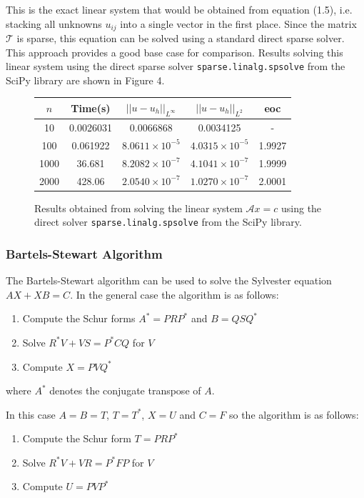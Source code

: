 \documentclass{article}
\numberwithin{equation}{section}
\begin{document}
This is the exact linear system that would be obtained from equation (1.5), i.e. stacking all unknowns $u_{ij}$ into a single vector in the first place. Since the matrix $\mathcal{T}$ is sparse, this equation can be solved using a standard direct sparse solver. This approach provides a good base case for comparison. Results solving this linear system using the direct sparse solver \texttt{sparse.linalg.spsolve} from the SciPy library are shown in Figure 4.

\begin{figure}[H]
\centering
\begin{tabular}{|c|c|c|c|c|}
\hline
$n$ & Time(s) & $|| u - u_h ||_{L^{\infty}}$ &$|| u - u_h ||_{L^{2}}$ & eoc \\
\hline
10 & 0.0026031 & 0.0066868 & 0.0034125 & - \\
100 & 0.061922 & $8.0611 \times 10^{-5}$ & $4.0315 \times 10^{-5}$ & 1.9927 \\
1000 & 36.681 & $8.2082 \times 10^{-7}$ & $4.1041 \times 10^{-7}$ & 1.9999  \\
2000 & 428.06 & $2.0540 \times 10^{-7}$ & $1.0270 \times 10^{-7}$ & 2.0001 \\
\hline
\end{tabular}
\captionsetup{justification=centering}
\caption{Results obtained from solving the linear system $\mathcal{A} x = c$ using the direct solver  \texttt{sparse.linalg.spsolve} from the SciPy library.}
\end{figure}

\subsubsection{Bartels-Stewart Algorithm}
The Bartels-Stewart algorithm \cite{Bartels} can be used to solve the Sylvester equation $AX + XB = C$. In the general case the algorithm is as follows:
\begin{enumerate}
\item Compute the Schur forms $A^* = PRP^*$ and $B=QSQ^*$
\item Solve $R^*V + VS = P^*CQ$ for $V$
\item Compute $X=PVQ^*$
\end{enumerate}
where $A^*$ denotes the conjugate transpose of $A$.

In this case $A=B=T$, $T=T^*$, $X=U$ and $C=F$ so the algorithm is as follows:
\begin{enumerate}
\item Compute the Schur form $T=PRP^*$
\item Solve $R^*V + VR = P^*FP$ for $V$
\item Compute $U=PVP^*$
\end{enumerate}
\end{document}
